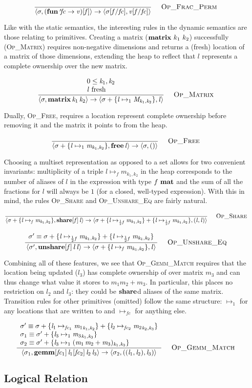\vspace{-\baselineskip}
\[
    \ottdruleOpXXFracXXPerm{}
\]

Like with the static semantics, the interesting rules in the dynamic semantics
are those relating to primitives. Creating a matrix ($\ottkw{matrix}\ k_1\
k_2$) successfully (\textsc{Op\_Matrix}) requires non-negative dimensions and
returns a (fresh) location of a matrix of those dimensions, extending the heap
to reflect that $l$ represents a complete ownership over the new matrix.

\vspace{-\baselineskip}
\[
    \ottdruleOpXXMatrix{}
\]

Dually, \textsc{Op\_Free}, requires a location represent complete ownership
before removing it and the matrix it points to from the heap.

\vspace{-\baselineskip}
\[
    \ottdruleOpXXFree{}
\]

Choosing a multiset representation as opposed to a set allows for two
convenient invariants: multiplicity of a triple $l \mapsto_f m_{k_1, k_2}$ in
the heap corresponds to the number of aliases of $l$ in the expression with
type $f\ \ottkw{mat}$ and the sum of all the fractions for $l$ will always be
$1$ (for a closed, well-typed expression). With this in mind, the rules
\textsc{Op\_Share} and \textsc{Op\_Unshare\_Eq} are fairly natural.

\vspace{-\baselineskip}
\[
    \ottdruleOpXXShare{} \\
\]

\vspace{-\baselineskip}
\[
    \ottdruleOpXXUnshareXXEq{}
\]

Combining all of these features, we see that \textsc{Op\_Gemm\_Match} requires
that the location being updated ($l_3$) has complete ownership of over matrix
$m_3$ and can thus change what value it stores to $m_1 m_2 + m_3$. In
particular, this places no restriction on $l_2$ and $l_3$: they could be
$\ottkw{share}$d aliases of the same matrix. Transition rules for other
primitives (omitted) follow the same structure: $\mapsto_1$ for any locations
that are written to and $\mapsto_{f\!c}$ for anything else.

\vspace{-\baselineskip}
\[
    \ottdruleOpXXGemmXXMatch{}
\]

\subsection{Logical Relation}\label{subsec:logical_rel}

